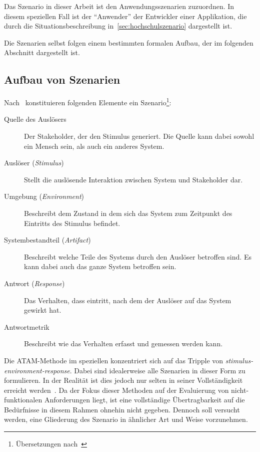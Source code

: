   Das Szenario in dieser Arbeit ist den Anwendungsszenarien zuzuordnen. In diesem speziellen Fall ist der "`Anwender"' der Entwickler einer Applikation, die durch die Situationsbeschreibung in~\ref{sec:hochschulszenario} dargestellt ist.
  
  Die Szenarien selbst folgen einem bestimmten formalen Aufbau, der im folgenden Abschnitt dargestellt ist.


\subsection{Aufbau von Szenarien} %
\label{sub:aufbau_von_szenarien}

  Nach~\citep[S. 75]{software_architecture_in_practice} konstituieren folgenden Elemente ein Szenario\footnote{Übersetzungen nach~\citep[S. 63]{effektive_software_architekturen}}:
  
  \begin{description}
    \item[Quelle des Auslösers] Der Stakeholder, der den Stimulus generiert. Die Quelle kann dabei sowohl ein Mensch sein, als auch ein anderes System.
    \item[Auslöser (\emph{Stimulus})] Stellt die auslösende Interaktion zwischen System und Stakeholder dar.
    \item[Umgebung (\emph{Environment})] Beschreibt dem Zustand in dem sich das System zum Zeitpunkt des Eintritts des Stimulus befindet.
    \item[Systembestandteil (\emph{Artifact})] Beschreibt welche Teile des Systems durch den Auslöser betroffen sind. Es kann dabei auch das ganze System betroffen sein.
    \item[Antwort (\emph{Response})] Das Verhalten, dass eintritt, nach dem der Auslöser auf das System gewirkt hat.
    \item[Antwortmetrik] Beschreibt wie das Verhalten erfasst und gemessen werden kann.
  \end{description}
  
  Die ATAM-Methode im speziellen konzentriert sich auf das Tripple von \emph{stimulus-environment-response}. Dabei sind idealerweise alle Szenarien in dieser Form zu formulieren. In der Realität ist dies jedoch nur selten in seiner Vollständigkeit erreicht werden~\citep[S. 53]{evaluating_software_architectures}. Da der Fokus dieser Methoden auf der Evaluierung von nicht-funktionalen Anforderungen liegt, ist eine vollständige Übertragbarkeit auf die Bedürfnisse in diesem Rahmen ohnehin nicht gegeben. Dennoch soll versucht werden, eine Gliederung des Szenario in ähnlicher Art und Weise vorzunehmen.

